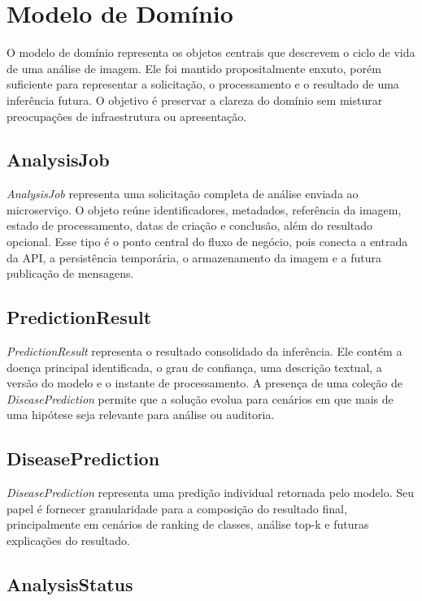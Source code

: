 \chapter{Modelo de Domínio}

O modelo de domínio representa os objetos centrais que descrevem o ciclo de vida de uma análise de imagem. Ele foi mantido propositalmente enxuto, porém suficiente para representar a solicitação, o processamento e o resultado de uma inferência futura. O objetivo é preservar a clareza do domínio sem misturar preocupações de infraestrutura ou apresentação.

\section{AnalysisJob}

\textit{AnalysisJob} representa uma solicitação completa de análise enviada ao microserviço. O objeto reúne identificadores, metadados, referência da imagem, estado de processamento, datas de criação e conclusão, além do resultado opcional. Esse tipo é o ponto central do fluxo de negócio, pois conecta a entrada da API, a persistência temporária, o armazenamento da imagem e a futura publicação de mensagens.

\section{PredictionResult}

\textit{PredictionResult} representa o resultado consolidado da inferência. Ele contém a doença principal identificada, o grau de confiança, uma descrição textual, a versão do modelo e o instante de processamento. A presença de uma coleção de \textit{DiseasePrediction} permite que a solução evolua para cenários em que mais de uma hipótese seja relevante para análise ou auditoria.

\section{DiseasePrediction}

\textit{DiseasePrediction} representa uma predição individual retornada pelo modelo. Seu papel é fornecer granularidade para a composição do resultado final, principalmente em cenários de ranking de classes, análise top-k e futuras explicações do resultado.

\section{AnalysisStatus}

